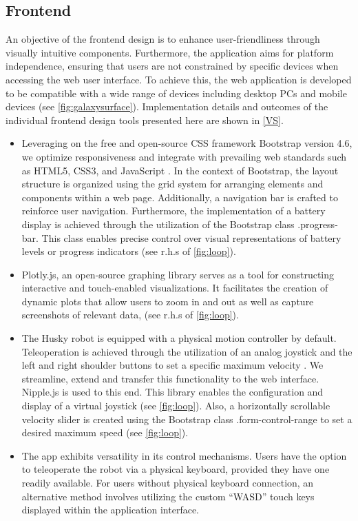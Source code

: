 \documentclass[conference]{IEEEtran}
\begin{document}
\subsection{Frontend}
An objective of the frontend design is to enhance user-friendliness through visually intuitive components. Furthermore, the application aims for platform independence, ensuring that users are not constrained by specific devices when accessing the web user interface. 
To achieve this, the web application is developed to be compatible with a wide range of devices including desktop PCs and mobile devices (see \cref{fig:galaxysurface}). Implementation details and outcomes of the individual frontend design tools presented here are shown in \ref{VS}.
\begin{itemize}
\item Leveraging on the free and open-source CSS framework Bootstrap version 4.6, we optimize responsiveness and integrate with prevailing web standards such as HTML5, CSS3, and JavaScript \cite{bootstrap}. 
In the context of Bootstrap, the layout structure is organized using the grid system for arranging elements and components within a web page. 
Additionally, a navigation bar is crafted to reinforce user navigation.
Furthermore, the implementation of a battery display is achieved through the utilization of the Bootstrap class .progress-bar. 
This class enables precise control over visual representations of battery levels or  progress indicators (see r.h.s of \cref{fig:loop}).
\item Plotly.js, an open-source graphing library serves as a tool for constructing interactive and touch-enabled visualizations. It facilitates the creation of dynamic plots that allow users to zoom in and out as well as capture screenshots of relevant data, \cite{plotly} (see r.h.s of \cref{fig:loop}). 
\item The Husky robot is equipped with a physical motion controller by default. Teleoperation is achieved through the utilization of an analog joystick and the left and right shoulder buttons to set a specific maximum velocity \cite{huskydriving}.
We streamline, extend and transfer this functionality to the web interface. Nipple.js is used to this end. This library enables the configuration and display of a virtual joystick \cite{nipplejs} (see \cref{fig:loop}). Also, a horizontally scrollable velocity slider is created using the Bootstrap class .form-control-range to set a desired maximum speed (see \cref{fig:loop}).
\item The app exhibits versatility in its control mechanisms. Users have the option to teleoperate the robot via a physical keyboard, provided they have one readily available. For users without  physical keyboard connection, an alternative method involves utilizing the custom “WASD” touch keys displayed within the application interface. 

\end{itemize}
\end{document}
